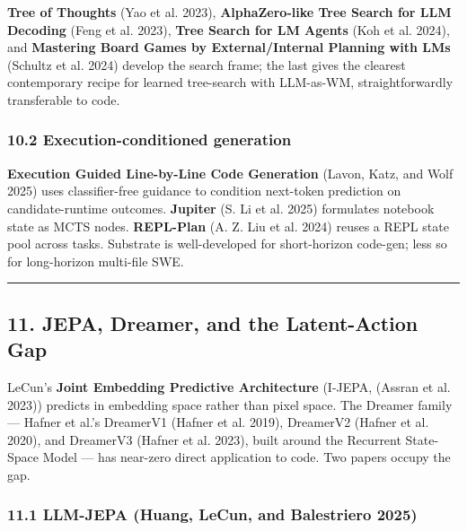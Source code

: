 \documentclass{article}
\begin{document}
\textbf{Tree of Thoughts} (Yao et al. 2023), \textbf{AlphaZero-like Tree
Search for LLM Decoding} (Feng et al. 2023), \textbf{Tree Search for LM
Agents} (Koh et al. 2024), and \textbf{Mastering Board Games by
External/Internal Planning with LMs} (Schultz et al. 2024) develop the
search frame; the last gives the clearest contemporary recipe for
learned tree-search with LLM-as-WM, straightforwardly transferable to
code.

\hypertarget{execution-conditioned-generation}{%
\subsubsection{10.2 Execution-conditioned
generation}\label{execution-conditioned-generation}}

\textbf{Execution Guided Line-by-Line Code Generation} (Lavon, Katz, and
Wolf 2025) uses classifier-free guidance to condition next-token
prediction on candidate-runtime outcomes. \textbf{Jupiter} (S. Li et al.
2025) formulates notebook state as MCTS nodes. \textbf{REPL-Plan} (A. Z.
Liu et al. 2024) reuses a REPL state pool across tasks. Substrate is
well-developed for short-horizon code-gen; less so for long-horizon
multi-file SWE.

\begin{center}\rule{0.5\linewidth}{0.5pt}\end{center}

\hypertarget{jepa-dreamer-and-the-latent-action-gap}{%
\subsection{11. JEPA, Dreamer, and the Latent-Action
Gap}\label{jepa-dreamer-and-the-latent-action-gap}}

LeCun's \textbf{Joint Embedding Predictive Architecture} (I-JEPA,
(Assran et al. 2023)) predicts in embedding space rather than pixel
space. The Dreamer family --- Hafner et al.'s DreamerV1 (Hafner et al.
2019), DreamerV2 (Hafner et al. 2020), and DreamerV3 (Hafner et al.
2023), built around the Recurrent State-Space Model --- has near-zero
direct application to code. Two papers occupy the gap.

\hypertarget{llm-jepa-arxiv2509_14252}{%
\subsubsection{11.1 LLM-JEPA (Huang, LeCun, and Balestriero
2025)}\label{llm-jepa-arxiv2509_14252}}
\end{document}
